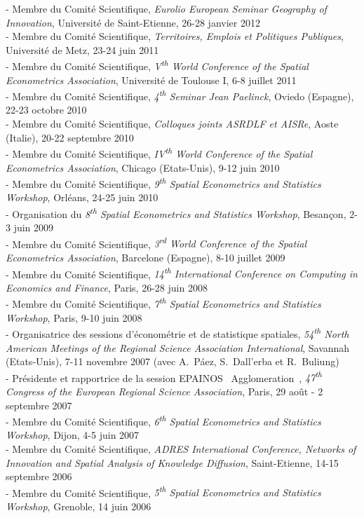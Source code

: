 \documentclass[a4paper,12pt]{article}
\begin{document}
- Membre du Comité Scientifique, \textit{Eurolio European Seminar Geography of Innovation}, Université de Saint-Etienne, 26-28 janvier 2012\\
- Membre du Comité Scientifique, \textit{Territoires, Emplois et Politiques Publiques}, Université de Metz, 23-24 juin 2011 \\
- Membre du Comité Scientifique, \textit{V\textsuperscript{th} World Conference of the Spatial Econometrics Association}, Université de Toulouse I, 6-8 juillet 2011\\
- Membre du Comité Scientifique, \textit{4\textsuperscript{th} Seminar Jean Paelinck}, Oviedo (Espagne), 22-23 octobre 2010\\
- Membre du Comité Scientifique, \textit{Colloques joints ASRDLF et AISRe}, Aoste (Italie), 20-22 septembre 2010\\
- Membre du Comité Scientifique, \textit{IV\textsuperscript{th} World Conference of the Spatial Econometrics Association}, Chicago (Etats-Unis), 9-12 juin 2010\\
- Membre du Comité Scientifique, \textit{9\textsuperscript{th} Spatial Econometrics and Statistics Workshop}, Orléans, 24-25 juin 2010\\
- Organisation du \textit{8\textsuperscript{th} Spatial Econometrics and Statistics Workshop}, Besançon, 2-3 juin 2009\\
- Membre du Comité Scientifique, \textit{3\textsuperscript{rd} World Conference of the Spatial Econometrics Association}, Barcelone (Espagne), 8-10 juillet 2009\\
- Membre du Comité Scientifique, \textit{14\textsuperscript{th} International Conference on Computing in Economics and Finance}, Paris, 26-28 juin 2008\\
- Membre du Comité Scientifique, \textit{7\textsuperscript{th} Spatial Econometrics and Statistics Workshop}, Paris, 9-10 juin 2008\\
- Organisatrice des sessions d'économétrie et de statistique spatiales, \textit{54\textsuperscript{th} North American Meetings of the Regional Science Association International}, Savannah (Etats-Unis), 7-11 novembre 2007 (avec A.~Páez, S.~Dall'erba et R.~Buliung) \\
- Présidente et rapportrice de la session EPAINOS \og~Agglomeration~\fg, \textit{47\textsuperscript{th} Congress of the European Regional Science Association}, Paris, 29 août - 2 septembre 2007\\
- Membre du Comité Scientifique, \textit{6\textsuperscript{th} Spatial Econometrics and Statistics Workshop}, Dijon, 4-5 juin 2007\\
- Membre du Comité Scientifique, \textit{ADRES International Conference, Networks of Innovation and Spatial Analysis of Knowledge Diffusion}, Saint-Etienne, 14-15 septembre 2006\\
- Membre du Comité Scientifique, \textit{5\textsuperscript{th} Spatial Econometrics and Statistics Workshop}, Grenoble, 14 juin 2006 \\
\end{document}
